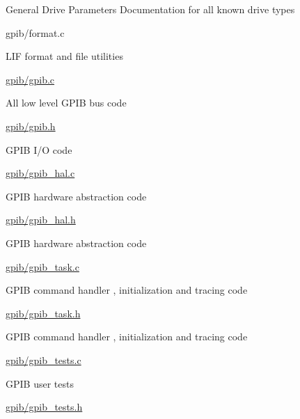 \begin{DoxyItemize}
\begin{DoxyItemize}
\begin{DoxyItemize}
\item General Drive Parameters Documentation for all known drive types
\end{DoxyItemize}
\item gpib/format.\+c
\begin{DoxyItemize}
\item L\+IF format and file utilities
\end{DoxyItemize}
\item \hyperlink{gpib_8c}{gpib/gpib.\+c}
\begin{DoxyItemize}
\item All low level G\+P\+IB bus code
\end{DoxyItemize}
\item \hyperlink{gpib_8h}{gpib/gpib.\+h}
\begin{DoxyItemize}
\item G\+P\+IB I/O code
\end{DoxyItemize}
\item \hyperlink{gpib__hal_8c}{gpib/gpib\+\_\+hal.\+c}
\begin{DoxyItemize}
\item G\+P\+IB hardware abstraction code
\end{DoxyItemize}
\item \hyperlink{gpib__hal_8h}{gpib/gpib\+\_\+hal.\+h}
\begin{DoxyItemize}
\item G\+P\+IB hardware abstraction code
\end{DoxyItemize}
\item \hyperlink{gpib__task_8c}{gpib/gpib\+\_\+task.\+c}
\begin{DoxyItemize}
\item G\+P\+IB command handler , initialization and tracing code
\end{DoxyItemize}
\item \hyperlink{gpib__task_8h}{gpib/gpib\+\_\+task.\+h}
\begin{DoxyItemize}
\item G\+P\+IB command handler , initialization and tracing code
\end{DoxyItemize}
\item \hyperlink{gpib__tests_8c}{gpib/gpib\+\_\+tests.\+c}
\begin{DoxyItemize}
\item G\+P\+IB user tests
\end{DoxyItemize}
\item \hyperlink{gpib__tests_8h}{gpib/gpib\+\_\+tests.\+h}

\end{DoxyItemize}
\end{DoxyItemize}
